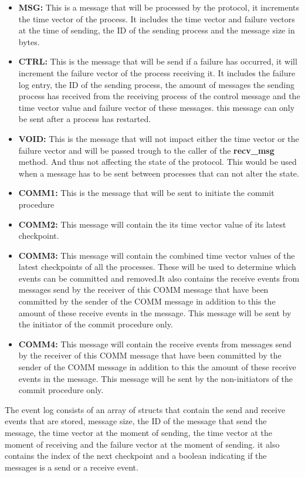\documentclass[twocolumn, a4paper,11pt]{article}%
\begin{document}
\begin{itemize}
	\item \textbf{MSG:} This is a message that will be processed by the protocol, it increments the time vector of the process. It includes the time vector and failure vectors at the time of sending, the ID of the sending process and the message size in bytes.
	\item \textbf{CTRL:} This is the message that will be send if a failure has occurred, it will increment the failure vector of the process receiving it. It includes the failure log entry, the ID of the sending process, the amount of messages the sending process has received from the receiving process of the control message and the time vector value and failure vector of these messages. this message can only be sent after a process has restarted.
	\item \textbf{VOID:} This is the message that will not impact either the time vector or the failure vector and will be passed trough to the caller of the \textbf{recv\_msg} method. And thus not affecting the state of the protocol. This would be used when a message has to be sent between processes that can not alter the state.
	\item \textbf{COMM1:} This is the message that will be sent to initiate the commit procedure
	\item \textbf{COMM2:} This message will contain the its time vector value of its latest checkpoint.
	\item \textbf{COMM3:} This message will contain the combined time vector values of the latest checkpoints of all the processes. These will be used to determine which events can be committed and removed.It also contains the receive events from messages send by the receiver of this COMM message that have been committed by the sender of the COMM message in addition to this the amount of these receive events in the message. This message will be sent by the initiator of the commit procedure only. 
	\item \textbf{COMM4:} This message will contain the receive events from messages send by the receiver of this COMM message that have been committed by the sender of the COMM message in addition to this the amount of these receive events in the message. This message will be sent by the non-initiators of the commit procedure only. 
\end{itemize}
\par The event log consists of an array of structs that contain the send and receive events that are stored, message size, the ID of the message that send the message, the time vector at the moment of sending, the time vector at the moment of receiving and the failure vector at the moment of sending. it also contains the index of the next checkpoint and a boolean indicating if the messages is a send or a receive event.
\end{document}
